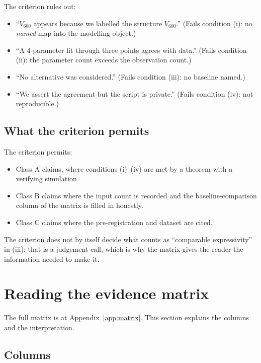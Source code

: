 \documentclass[11pt,a4paper]{article}
\newcommand{\Vsix}{V_{600}}
\begin{document}
The criterion rules out:
\begin{itemize}[leftmargin=*]
  \item ``$\Vsix$ appears because we labelled the structure $\Vsix$.''
        (Fails condition (i): no \emph{named} map into the modelling
        object.)
  \item ``A 4-parameter fit through three points agrees with data.''
        (Fails condition (ii): the parameter count exceeds the
        observation count.)
  \item ``No alternative was considered.''
        (Fails condition (iii): no baseline named.)
  \item ``We assert the agreement but the script is private.''
        (Fails condition (iv): not reproducible.)
\end{itemize}

\subsection{What the criterion permits}

The criterion permits:
\begin{itemize}[leftmargin=*]
  \item Class A claims, where conditions (i)--(iv) are met by a
        theorem with a verifying simulation.
  \item Class B claims where the input count is recorded and the
        baseline-comparison column of the matrix is filled in
        honestly.
  \item Class C claims where the pre-registration and dataset are
        cited.
\end{itemize}

The criterion does not by itself decide what counts as
``comparable expressivity'' in (iii); that is a judgement call,
which is why the matrix gives the reader the information needed to
make it.

\section{Reading the evidence matrix}
\label{sec:reading}

The full matrix is at Appendix~\ref{app:matrix}. This section
explains the columns and the interpretation.

\subsection{Columns}
\end{document}
